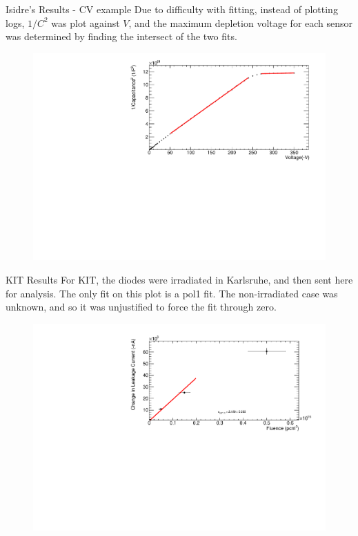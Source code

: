 \documentclass{beamer}
\begin{document}
    \begin{frame}{Isidre's Results - CV example}
    Due to difficulty with fitting, instead of plotting logs, $1/C^2$ was plot against $V$, and the maximum depletion voltage for each sensor was determined by finding the intersect of the two fits.
        \begin{figure}
            \centering
            \includegraphics[width = 0.95\linewidth]{IsidreCVexample.pdf}
        \end{figure}
        
    \end{frame}
    
    \begin{frame}{KIT Results}
    For KIT, the diodes were irradiated in Karlsruhe, and then sent here for analysis. The only fit on this plot is a pol1 fit. The non-irradiated case was unknown, and so it was unjustified to force the fit through zero.
        \begin{figure}
            \centering
            \includegraphics[width = 0.95\linewidth]{KIT.pdf}
        \end{figure}
    \end{frame}
    
\end{document}
